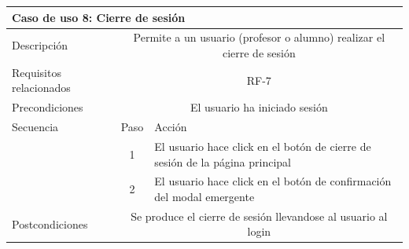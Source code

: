 \hspace{3cm}

\begin{adjustwidth}{-2cm}{}
\begin{tabular}[H]{l c l}
\toprule 
\multicolumn{3}{l}{\textbf{Caso de uso 8: Cierre de sesión}}\\
\midrule
Descripción & \multicolumn{2}{p{10cm}}{Permite a un usuario (profesor o alumno) realizar el cierre de sesión}\\
\midrule
Requisitos relacionados & \multicolumn{2}{p{10cm}}{RF-7}\\
\midrule
Precondiciones & \multicolumn{2}{p{10cm}}{El usuario ha iniciado sesión}\\
\midrule
Secuencia & Paso & Acción \\
\cmidrule{2-3}
         & 1 &  \multicolumn{1}{p{8cm}}{El usuario hace click en el botón de cierre de sesión de la página principal}\\
         & 2 &  \multicolumn{1}{p{8cm}}{El usuario hace click en el botón de confirmación del modal emergente}\\
         
\midrule
Postcondiciones & \multicolumn{2}{p{10cm}}{Se produce el cierre de sesión llevandose al usuario al login}\\
\bottomrule 
\end{tabular}
\end{adjustwidth}
